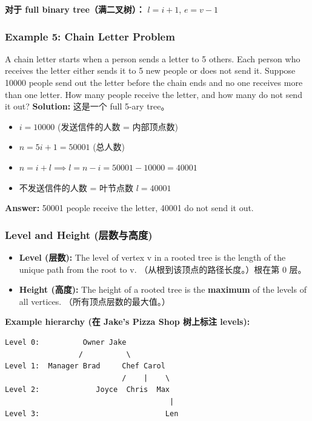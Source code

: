 \documentclass[10pt,a4paper,openany]{ctexbook}
\theoremstyle{definition}
\theoremstyle{remark}
\begin{document}
\textbf{对于 full binary tree（满二叉树）：} $l = i + 1$, $e = v - 1$
\vspace{-2pt}

\subsubsection{Example 5: Chain Letter Problem}

A chain letter starts when a person sends a letter to 5 others. Each person who receives the letter either sends it to 5 new people or does not send it. Suppose 10000 people send out the letter before the chain ends and no one receives more than one letter. How many people receive the letter, and how many do not send it out?
\textbf{Solution:}
这是一个 full 5-ary tree。
\begin{itemize}
\item $i = 10000$ (发送信件的人数 = 内部顶点数)
\item $n = 5i + 1 = 50001$ (总人数)
\item $n = i + l \implies l = n - i = 50001 - 10000 = 40001$
\item 不发送信件的人数 = 叶节点数 $l = 40001$

\end{itemize}

\textbf{Answer:} 50001 people receive the letter, 40001 do not send it out.
\vspace{-2pt}

\subsubsection{Level and Height (层数与高度)}

\begin{itemize}
\item \textbf{Level (层数):} The level of vertex v in a rooted tree is the length of the unique path from the root to v. （从根到该顶点的路径长度。）根在第 0 层。
\item \textbf{Height (高度):} The height of a rooted tree is the \textbf{maximum} of the levels of all vertices. （所有顶点层数的最大值。）

\end{itemize}

\textbf{Example hierarchy (在 Jake's Pizza Shop 树上标注 levels):}
{\footnotesize\begin{verbatim}
Level 0:          Owner Jake
                 /          \
Level 1:  Manager Brad     Chef Carol
                           /    |    \
Level 2:             Joyce  Chris  Max
                                      |
Level 3:                             Len
\end{verbatim}}
\end{document}
